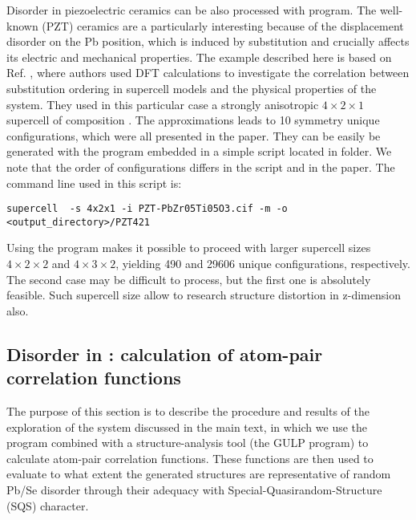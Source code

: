 \documentclass[a4paper,10pt]{article}
\begin{document}
Disorder in piezoelectric ceramics can be also processed with \sups{} program. The well-known  (PZT) ceramics are a particularly interesting because of the displacement disorder on the Pb position, which is induced by  substitution and crucially affects its electric and mechanical properties. The example described here is based on Ref. \cite{Grinberg2004}, where authors used DFT calculations to investigate the correlation between substitution ordering in supercell models and the physical properties of the system. They used in this particular case a strongly anisotropic $4\times2\times1$ supercell of composition . The approximations leads to 10 symmetry unique configurations, which were all presented in the paper. They can be easily be generated with the \sups{} program embedded in a simple script  located in  folder. We note that the order of configurations differs in the script and in the paper. The command line used in this script is:
\begin{Verbatim}[breaklines]
  supercell  -s 4x2x1 -i PZT-PbZr05Ti05O3.cif -m -o <output_directory>/PZT421
\end{Verbatim}
Using the \sups{} program makes it possible to proceed with larger supercell sizes $4\times2\times2$ and $4\times3\times2$, yielding 490 and 29606 unique configurations, respectively. The second case may be difficult to process, but the first one is absolutely feasible. Such supercell size allow to research structure distortion in z-dimension also.

\subsection*{Disorder in : calculation of atom-pair correlation functions}
The purpose of this section is to describe the procedure and results of the exploration of the  system discussed in the main text, in which we use the \sups{} program combined with a structure-analysis tool (the GULP program) to calculate atom-pair correlation functions. These functions are then used to evaluate to what extent the generated structures are representative of random Pb/Se disorder through their adequacy with Special-Quasirandom-Structure (SQS) character\cite{Zunger1990}.
\end{document}
